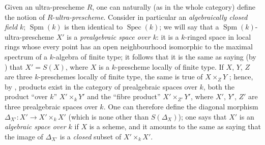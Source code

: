 
\begin{env}[10.10.2]
\label{IV.10.10.2}
Given an ultra-prescheme $R$, one can naturally (as in the whole category) define the notion of $R$-\emph{ultra-prescheme}.
Consider in particular an \emph{algebraically closed field $k$}; $\operatorname{Spm}(k)$ is then identical to $\operatorname{Spec}(k)$; we will say that a $\operatorname{Spm}(k)$-ultra-prescheme $X'$ is a \emph{prealgebraic space over $k$}: it is a $k$-ringed space in local rings whose every point has an open neighbourhood isomorphic to the maximal spectrum of a $k$-algebra of finite type; it follows that it is the same as saying (by ) that $X'=S(X)$, where $X$ is a $k$-prescheme locally of finite type.
If $X$, $Y$, $Z$ are three $k$-preschemes locally of finite type, the same is true of $X\times_ZY$ ; hence, by , products exist in the category of prealgebraic spaces over $k$, both the product ``over $k$'' $X'\times_kY'$ and the ``fibre product'' $X'\times_{Z'}Y'$, where $X'$, $Y'$, $Z'$ are three prealgebraic spaces over $k$.
One can therefore define the diagonal morphism $\Delta_{X'}:X'\to X'\times_k X'$ (which is none other than $S(\Delta_X)$); one says that $X'$ is an \emph{algebraic space over $k$} if $X$ is a scheme, and it amounts to the same as saying that the image of $\Delta_{X'}$ is a \emph{closed} subset of $X'\times_k X'$.
\end{env}

